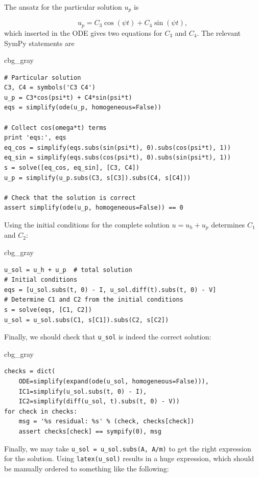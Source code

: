 \documentclass[graybox,envcountchap,sectrefs,final]{svmonodo}
\newenvironment{_cod_tight}[1]{
   \def\FrameCommand{\colorbox{#1}}
   \FrameRule0.6pt\MakeFramed {\FrameRestore}\vskip3mm}
   {\vskip0mm\endMakeFramed}
\newenvironment{cod}[1]{
\bgroup\rmfamily
\fboxsep=0mm\relax
\begin{_cod_tight}{#1}
\list{}{\parsep=-2mm\parskip=0mm\topsep=0pt\leftmargin=2mm
\rightmargin=2\leftmargin\leftmargin=4pt\relax}
\item\relax}
{\endlist\end{_cod_tight}\egroup}
\begin{document}
The ansatz for the particular solution $u_p$ is

\[ u_p= C_3\cos(\psi t) + C_4\sin(\psi t),\]
which inserted in the ODE gives two equations
for $C_3$ and $C_4$. The relevant SymPy statements are

\begin{cod}{cbg_gray}\begin{Verbatim}[numbers=none,fontsize=\fontsize{9pt}{9pt},baselinestretch=0.95,xleftmargin=2mm]
# Particular solution
C3, C4 = symbols('C3 C4')
u_p = C3*cos(psi*t) + C4*sin(psi*t)
eqs = simplify(ode(u_p, homogeneous=False))

# Collect cos(omega*t) terms
print 'eqs:', eqs
eq_cos = simplify(eqs.subs(sin(psi*t), 0).subs(cos(psi*t), 1))
eq_sin = simplify(eqs.subs(cos(psi*t), 0).subs(sin(psi*t), 1))
s = solve([eq_cos, eq_sin], [C3, C4])
u_p = simplify(u_p.subs(C3, s[C3]).subs(C4, s[C4]))

# Check that the solution is correct
assert simplify(ode(u_p, homogeneous=False)) == 0
\end{Verbatim}
\end{cod}
\noindent
Using the initial conditions for the complete solution $u=u_h+u_p$
determines $C_1$ and $C_2$:

\begin{cod}{cbg_gray}\begin{Verbatim}[numbers=none,fontsize=\fontsize{9pt}{9pt},baselinestretch=0.95,xleftmargin=2mm]
u_sol = u_h + u_p  # total solution
# Initial conditions
eqs = [u_sol.subs(t, 0) - I, u_sol.diff(t).subs(t, 0) - V]
# Determine C1 and C2 from the initial conditions
s = solve(eqs, [C1, C2])
u_sol = u_sol.subs(C1, s[C1]).subs(C2, s[C2])
\end{Verbatim}
\end{cod}
\noindent
Finally, we should check that \Verb!u_sol! is indeed the correct solution:

\begin{cod}{cbg_gray}\begin{Verbatim}[numbers=none,fontsize=\fontsize{9pt}{9pt},baselinestretch=0.95,xleftmargin=2mm]
checks = dict(
    ODE=simplify(expand(ode(u_sol, homogeneous=False))),
    IC1=simplify(u_sol.subs(t, 0) - I),
    IC2=simplify(diff(u_sol, t).subs(t, 0) - V))
for check in checks:
    msg = '%s residual: %s' % (check, checks[check])
    assert checks[check] == sympify(0), msg
\end{Verbatim}
\end{cod}
\noindent
Finally, we may take \Verb!u_sol = u_sol.subs(A, A/m)! to get the right
expression for the solution.
Using \Verb!latex(u_sol)! results in a huge expression, which should be
manually ordered to something like the following:
\end{document}
